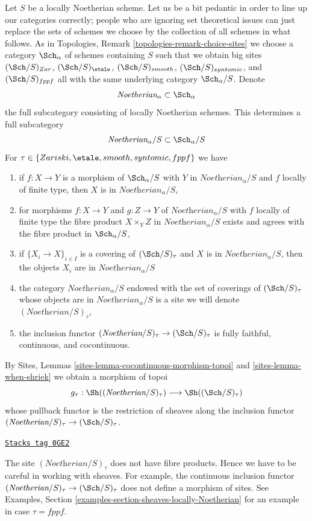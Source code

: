 \medskip\noindent
Let $S$ be a locally Noetherian scheme. Let us be a bit pedantic in order
to line up our categories correctly; people who are ignoring set theoretical
issues can just replace the sets of schemes we choose by the collection
of all schemes in what follows. As in
Topologies, Remark \ref{topologies-remark-choice-sites}
we choose a category $\Sch_\alpha$ of schemes containing
$S$ such that we obtain big sites $(\Sch/S)_{Zar}$,
$(\Sch/S)_\etale$, $(\Sch/S)_{smooth}$, $(\Sch/S)_{syntomic}$,
and $(\Sch/S)_{fppf}$ all with the same underlying
category $\Sch_\alpha/S$. Denote
$$
\textit{Noetherian}_\alpha \subset \Sch_\alpha
$$
the full subcategory consisting of locally Noetherian schemes.
This determines a full subcategory
$$
\textit{Noetherian}_\alpha/S \subset \Sch_\alpha/S
$$
For $\tau \in \{Zariski, \etale, smooth, syntomic, fppf\}$ we have
\begin{enumerate}
\item if $f : X \to Y$ is a morphism of $\Sch_\alpha/S$
with $Y$ in $\textit{Noetherian}_\alpha/S$ and
$f$ locally of finite type, then $X$ is in $\textit{Noetherian}_\alpha/S$,
\item for morphisms $f : X \to Y$ and $g : Z \to Y$ of
$\textit{Noetherian}_\alpha/S$ with $f$ locally of finite type
the fibre product $X \times_Y Z$ in $\textit{Noetherian}_\alpha/S$
exists and agrees with the fibre product in $\Sch_\alpha/S$,
\item if $\{X_i \to X\}_{i \in I}$ is a covering of
$(\Sch/S)_\tau$ and $X$ is in $\textit{Noetherian}_\alpha/S$,
then the objects $X_i$ are in $\textit{Noetherian}_\alpha/S$
\item the category $\textit{Noetherian}_\alpha/S$ endowed
with the set of coverings of $(\Sch/S)_\tau$ whose objects
are in $\textit{Noetherian}_\alpha/S$ is a site
we will denote $(\textit{Noetherian}/S)_\tau$,
\item the inclusion functor
$(\textit{Noetherian}/S)_\tau \to (\Sch/S)_\tau$
is fully faithful, continuous, and cocontinuous.
\end{enumerate}
By Sites, Lemmas \ref{sites-lemma-cocontinuous-morphism-topoi} and
\ref{sites-lemma-when-shriek} we obtain a morphism of topoi
$$
g_\tau : \Sh((\textit{Noetherian}/S)_\tau) \longrightarrow \Sh((\Sch/S)_\tau)
$$
whose pullback functor is the restriction of sheaves along
the inclusion functor $(\textit{Noetherian}/S)_\tau \to (\Sch/S)_\tau$.

\begin{remark}[Warning]

\label{artin-remark-no-fibre-products}
\href{https://stacks.math.columbia.edu/tag/0GE2}{\texttt{Stacks tag 0GE2}}

The site $(\textit{Noetherian}/S)_\tau$ does not have fibre products.
Hence we have to be careful in working with sheaves. For example,
the continuous inclusion functor
$(\textit{Noetherian}/S)_\tau \to (\Sch/S)_\tau$
does not define a morphism of sites. See
Examples, Section \ref{examples-section-sheaves-locally-Noetherian}
for an example in case $\tau = fppf$.
\end{remark}

